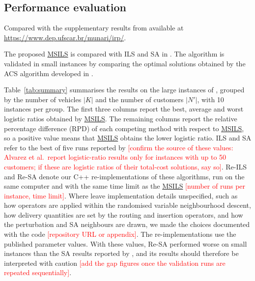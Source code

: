 \documentclass{article}
\begin{document}
\subsection{Performance evaluation}\label{sec:performance evaluation}


Compared with the supplementary results from \cite{alvarez2018iterated} available at \url{https://www.dep.ufscar.br/munari/irp/}. 


The proposed \hyperref[alg:MSILS]{MSILS} is compared with ILS and SA in \cite{alvarez2018iterated}. The algorithm is validated in small instances by comparing the optimal solutions obtained by the ACS algorithm developed in \cite{archetti2019exact}.

Table~\ref{tab:summary} summarises the results on the large instances of
\cite{archetti2012hybrid}, grouped by the number of vehicles $|K|$ and the
number of customers $|N'|$, with 10 instances per group. The first three
columns report the best, average and worst logistic ratios obtained by
\hyperref[alg:MSILS]{MSILS}. The remaining columns report the relative
percentage difference (RPD) of each competing method with respect to
\hyperref[alg:MSILS]{MSILS}, so a positive value means that
\hyperref[alg:MSILS]{MSILS} obtains the lower logistic ratio. ILS and SA refer
to the best of five runs reported by \cite{alvarez2018iterated}
\textcolor{red}{[confirm the source of these values: Alvarez et al.\ report
logistic-ratio results only for instances with up to 50 customers; if these
are logistic ratios of their total-cost solutions, say so]}. Re-ILS and Re-SA
denote our C++ re-implementations of these algorithms, run on the same
computer and with the same time limit as the \hyperref[alg:MSILS]{MSILS}
\textcolor{red}{[number of runs per instance, time limit]}. Where
\cite{alvarez2018iterated} leave implementation details unspecified, such as
how operators are applied within the randomised variable neighbourhood
descent, how delivery quantities are set by the routing and insertion
operators, and how the perturbation and SA neighbours are drawn, we made the
choices documented with the code \textcolor{red}{[repository URL or
appendix]}. The re-implementations use the published parameter values. With
these values, Re-SA performed worse on small instances than the SA results
reported by \cite{alvarez2018iterated}, and its results should therefore be
interpreted with caution \textcolor{red}{[add the gap figures once the
validation runs are repeated sequentially]}.
\end{document}
